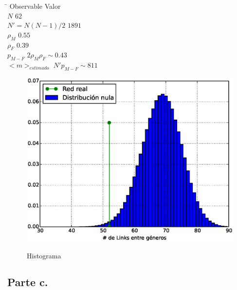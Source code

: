 \begin{tabbing}
\hspace{5cm} \= \hspace{5cm} \kill
Observable \> Valor \\
$N$ \> $62$ \\
$N' = N(N-1)/2$ \> $1891$ \\
$\rho_{M}$ \> $0.55$ \\
$\rho_{F}$ \> $0.39$ \\
$p_{M-F}$ \> $2 \rho_{M} \rho_{F} \sim 0.43 $ \\
$<m>_{estimado}$ \> $N' p_{M-F} \sim 811$
\end{tabbing}



\begin{figure}[h]
\centering
\includegraphics[scale = 0.50]{figuras/Histograma}
\label{fig:Histograma}
\caption{Histograma}
\end{figure}

\subsection{Parte c.}

